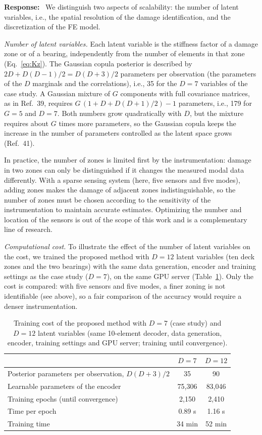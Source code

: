 \documentclass[11pt]{article}
\newenvironment{response}{\par\smallskip\noindent\color{resp}\textbf{Response:}\ }{\par}
\begin{document}
\begin{response}
We distinguish two aspects of scalability: the number of latent variables, i.e., the spatial resolution of the damage
identification, and the discretization of the FE model.

\textit{Number of latent variables.} Each latent variable is the stiffness factor of a damage zone or of a bearing, independently from the number of elements in that zone (Eq.~\eqref{eq:Kz}). 
The Gaussian copula posterior is described by $2D+D(D-1)/2=D(D+3)/2$ parameters per observation (the parameters of
the $D$ marginals and the correlations), i.e., 35 for the $D=7$ variables of the case study. A Gaussian mixture of $G$
components with full covariance matrices, as in Ref.~39, requires $G\,(1+D+D(D+1)/2)-1$ parameters, i.e., 179 for
$G=5$ and $D=7$. Both numbers grow quadratically with $D$, but the mixture requires about $G$ times more parameters, so
the Gaussian copula keeps the increase in the number of parameters controlled as the latent space grows (Ref.~41).

In practice, the number of zones is limited first by
the instrumentation: damage in two zones can only be distinguished if it changes the measured modal data differently.
With a sparse sensing system (here, five sensors and five modes), adding zones makes the damage of adjacent zones
indistinguishable, so the number of zones must be chosen according to the sensitivity of the instrumentation to
maintain accurate estimates. Optimizing the number and location of the sensors is out of the scope of this work and is
a complementary line of research.

\textit{Computational cost.} To illustrate the effect of the number of latent variables on the cost, we trained the
proposed method with $D=12$ latent variables (ten deck zones and the two bearings) with the same data generation,
encoder and training settings as the case study ($D=7$), on the same GPU server (Table~\ref{tab:scal}). Only the cost is
compared: with five sensors and five modes, a finer zoning is not identifiable (see above), so a fair comparison of the
accuracy would require a denser instrumentation.

\begin{table}[H]
\centering\small
\caption{Training cost of the proposed method with $D=7$ (case study) and $D=12$ latent variables (same 10-element
decoder, data generation, encoder, training settings and GPU server; training until convergence).}
\label{tab:scal}
\begin{tabular}{lcc}
\toprule
 & $D=7$ & $D=12$ \\
\midrule
Posterior parameters per observation, $D(D+3)/2$ & 35 & 90 \\
Learnable parameters of the encoder & 75,306 & 83,046 \\
Training epochs (until convergence) & 2,150 & 2,410 \\
Time per epoch & 0.89 s & 1.16 s \\
Training time & 34 min & 52 min \\
\bottomrule
\end{tabular}
\end{table}


\end{response}
\end{document}
